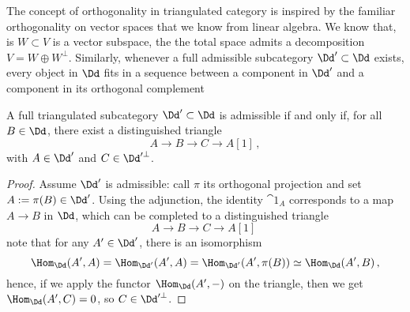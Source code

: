The concept of orthogonality in triangulated category is inspired 
by the familiar orthogonality on vector spaces that we know from linear algebra.
We know that, is $W \subset V$ is a vector subspace, the the total
space admits a decomposition $V = W \oplus W^{\perp}$.
Similarly, whenever a full admissible subcategory $\Dd' \subset \Dd$ exists,
every object in $\Dd$ fits in a sequence between a component in $\Dd'$
and a component in its orthogonal complement
\begin{lemma}\label{admissible-dec}
    A full triangulated subcategory $\Dd' \subset \Dd$
    is admissible if and only if, for all $B \in \Dd$,
    there exist a distinguished triangle
    \begin{equation*}
        A \longrightarrow B \longrightarrow C \longrightarrow A[1]\,,
    \end{equation*}
    with $A \in \Dd'$ and $C \in \Dd'^{\perp}$.
    \begin{proof}
        Assume $\Dd'$ is admissible: call $\pi$ its orthogonal projection
        and set $A:=\pi(B) \in \Dd'$.
        Using the adjunction, the identity $\cat{1}_{A}$ corresponds
        to a map $A \to B$ in $\Dd$, which can be completed
        to a distinguished triangle
        \begin{equation*}
            A \longrightarrow B \longrightarrow C \longrightarrow A[1]\;
        \end{equation*}
        note that for any $A' \in \Dd'$, there is an isomorphism
        \begin{equation*}
            \Hom_{\Dd}(A',A) 
            = \Hom_{\Dd'}(A',A)
            = \Hom_{\Dd'}(A',\pi(B)) 
            \simeq \Hom_{\Dd}(A',B)\,,
        \end{equation*}
        hence, if we apply the functor $\Hom_{\Dd}(A',-)$ on the triangle,
        then we get $\Hom_{\Dd}(A',C)=0$, so $C \in \Dd'^{\perp}$.


\end{proof}
\end{lemma}
